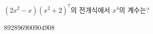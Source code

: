 $(2x^2-x)(x^2+2)^7$의 전개식에서 $x^4$의 계수는?
\begin{choices32}{$892$}{$896$}{$900$}{$904$}{$908$}\end{choices32}
